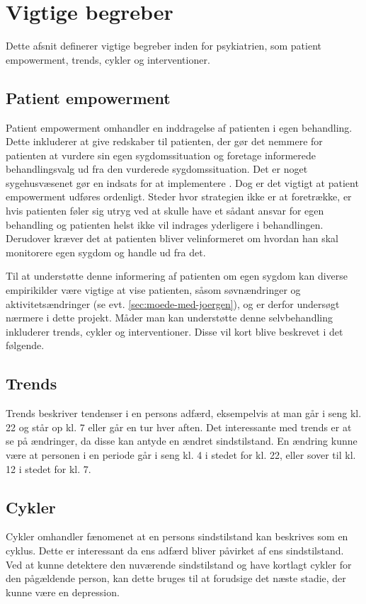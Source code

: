 \section{Vigtige begreber}
Dette afsnit definerer vigtige begreber inden for psykiatrien, som patient empowerment, trends, cykler og interventioner.

\subsection{Patient empowerment}\label{sec:patientempowerment}
Patient empowerment omhandler en inddragelse af patienten i egen behandling.
Dette inkluderer at give redskaber til patienten, der gør det nemmere for patienten at vurdere sin egen sygdomssituation og foretage informerede behandlingsvalg ud fra den vurderede sygdomssituation.
Det er noget sygehusvæsenet gør en indsats for at implementere \citep{misc:patientpowerhovedstaden}.
Dog er det vigtigt at patient empowerment udføres ordenligt.
Steder hvor strategien ikke er at foretrække, er hvis patienten føler sig utryg ved at skulle have et sådant ansvar for egen behandling og patienten helst ikke vil indrages yderligere i behandlingen.
Derudover kræver det at patienten bliver velinformeret om hvordan han skal monitorere egen sygdom og handle ud fra det.

Til at understøtte denne informering af patienten om egen sygdom kan diverse empirikilder være vigtige at vise patienten, såsom søvnændringer og aktivitetsændringer (se evt. \cref{sec:moede-med-joergen}), og er derfor undersøgt nærmere i dette projekt.
Måder man kan understøtte denne selvbehandling inkluderer trends, cykler og interventioner.
Disse vil kort blive beskrevet i det følgende.

\subsection{Trends}
Trends beskriver tendenser i en persons adfærd, eksempelvis at man går i seng kl. 22 og står op kl. 7 eller går en tur hver aften.
Det interessante med trends er at se på ændringer, da disse kan antyde en ændret sindstilstand.
En ændring kunne være at personen i en periode går i seng kl. 4 i stedet for kl. 22, eller sover til kl. 12 i stedet for kl. 7.

\subsection{Cykler}
Cykler omhandler fænomenet at en persons sindstilstand kan beskrives som en cyklus.
Dette er interessant da ens adfærd bliver påvirket af ens sindstilstand.
Ved at kunne detektere den nuværende sindstilstand og have kortlagt cykler for den pågældende person, kan dette bruges til at forudsige det næste stadie, der kunne være en depression.

